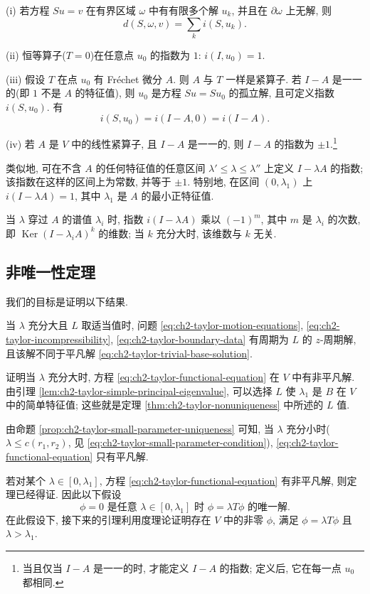 (i) 若方程 $Su=v$ 在有界区域 $\omega$ 中有有限多个解 $u_k$, 并且在 $\partial\omega$ 上无解, 则
\[
d(S,\omega,v)=\sum_k i(S,u_k).
\]

(ii) 恒等算子($T=0$)在任意点 $u_0$ 的指数为 $1$: $i(I,u_0)=1$.

(iii) 假设 $T$ 在点 $u_0$ 有 Fréchet 微分 $A$. 则 $A$ 与 $T$ 一样是紧算子. 若 $I-A$ 是一一的(即 $1$ 不是 $A$ 的特征值), 则 $u_0$ 是方程 $Su=Su_0$ 的孤立解, 且可定义指数 $i(S,u_0)$. 有
\[
i(S,u_0)=i(I-A,0)=i(I-A).
\]

\hypertarget{chapter-02-page-179}{}
(iv) 若 $A$ 是 $V$ 中的线性紧算子, 且 $I-A$ 是一一的, 则 $I-A$ 的指数为 $\pm1$.\footnote{当且仅当 $I-A$ 是一一的时, 才能定义 $I-A$ 的指数; 定义后, 它在每一点 $u_0$ 都相同.}

类似地, 可在不含 $A$ 的任何特征值的任意区间 $\lambda'\leq\lambda\leq\lambda''$ 上定义 $I-\lambda A$ 的指数; 该指数在这样的区间上为常数, 并等于 $\pm1$. 特别地, 在区间 $(0,\lambda_1)$ 上 $i(I-\lambda A)=1$, 其中 $\lambda_1$ 是 $A$ 的最小正特征值.

当 $\lambda$ 穿过 $A$ 的谱值 $\lambda_i$ 时, 指数 $i(I-\lambda A)$ 乘以 $(-1)^m$, 其中 $m$ 是 $\lambda_i$ 的次数, 即 $\operatorname{Ker}(I-\lambda_iA)^k$ 的维数; 当 $k$ 充分大时, 该维数与 $k$ 无关.

\subsection{非唯一性定理}
\label{subsec:ch2-taylor-nonuniqueness-theorem}
我们的目标是证明以下结果.

\begin{Theorem}
\label{thm:ch2-taylor-nonuniqueness}
当 $\lambda$ 充分大且 $L$ 取适当值时, 问题 \eqref{eq:ch2-taylor-motion-equations}, \eqref{eq:ch2-taylor-incompressibility}, \eqref{eq:ch2-taylor-boundary-data} 有周期为 $L$ 的 $z$-周期解, 且该解不同于平凡解 \eqref{eq:ch2-taylor-trivial-base-solution}.
\end{Theorem}

\begin{Proof}
证明当 $\lambda$ 充分大时, 方程 \eqref{eq:ch2-taylor-functional-equation} 在 $V$ 中有非平凡解. 由引理 \ref{lem:ch2-taylor-simple-principal-eigenvalue}, 可以选择 $L$ 使 $\lambda_1$ 是 $B$ 在 $V$ 中的简单特征值; 这些就是定理 \ref{thm:ch2-taylor-nonuniqueness} 中所述的 $L$ 值.

由命题 \ref{prop:ch2-taylor-small-parameter-uniqueness} 可知, 当 $\lambda$ 充分小时($\lambda\leq c(r_1,r_2)$, 见 \eqref{eq:ch2-taylor-small-parameter-condition}), \eqref{eq:ch2-taylor-functional-equation} 只有平凡解.

若对某个 $\lambda\in[0,\lambda_1]$, 方程 \eqref{eq:ch2-taylor-functional-equation} 有非平凡解, 则定理已经得证. 因此以下假设
\begin{equation}
\phi=0\text{ 是任意 }\lambda\in[0,\lambda_1]\text{ 时 }\phi=\lambda T\phi\text{ 的唯一解}.
\label{eq:ch2-taylor-trivial-solution-assumption}
\end{equation}
在此假设下, 接下来的引理利用度理论证明存在 $V$ 中的非零 $\phi$, 满足 $\phi=\lambda T\phi$ 且 $\lambda>\lambda_1$.
\end{Proof}

